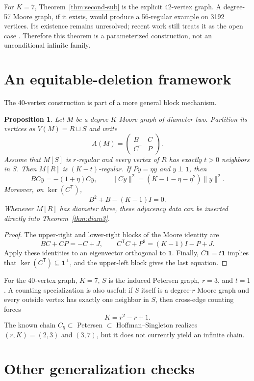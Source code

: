 \documentclass[11pt,reqno]{amsart}
\newcommand{\one}{\mathbf 1}
\theoremstyle{plain}
\newtheorem{proposition}[theorem]{Proposition}
\theoremstyle{definition}
\theoremstyle{remark}
\begin{document}
For $K=7$, Theorem~\ref{thm:second-sub} is the explicit 42-vertex graph.  A
degree-57 Moore graph, if it exists, would produce a 56-regular example on
3192 vertices.  Its existence remains unresolved; recent work still treats
it as the open case \cite{SmithMontemanni2026}.  Therefore this theorem is a
parameterized construction, not an unconditional infinite family.

\section{An equitable-deletion framework}

The 40-vertex construction is part of a more general block mechanism.

\begin{proposition}\label{prop:equitable-delete}
Let $M$ be a degree-$K$ Moore graph of diameter two.  Partition its vertices
as $V(M)=R\sqcup S$ and write
\[
 A(M)=\begin{pmatrix}B&C\\C^{\mathsf T}&P\end{pmatrix}.
\]
Assume that $M[S]$ is $r$-regular and every vertex of $R$ has exactly $t>0$
neighbors in $S$.  Then $M[R]$ is $(K-t)$-regular.  If $Py=\eta y$ and
$y\perp\one$, then
\[
 BCy=-(1+\eta)Cy,
 \qquad
 \|Cy\|^2=(K-1-\eta-\eta^2)\|y\|^2.
\]
Moreover, on $\ker(C^{\mathsf T})$,
\[
 B^2+B-(K-1)I=0.
\]
Whenever $M[R]$ has diameter three, these adjacency data can be inserted
directly into Theorem~\ref{thm:diam3}.
\end{proposition}

\begin{proof}
The upper-right and lower-right blocks of the Moore identity are
\[
 BC+CP=-C+J,
 \qquad
 C^{\mathsf T}C+P^2=(K-1)I-P+J.
\]
Apply these identities to an eigenvector orthogonal to $\one$.  Finally,
$C\one=t\one$ implies that $\ker(C^{\mathsf T})\subseteq\one^\perp$, and
the upper-left block gives the last equation.
\end{proof}

For the 40-vertex graph, $K=7$, $S$ is the induced Petersen graph,
$r=3$, and $t=1$.  A counting specialization is also useful: if $S$ itself
is a degree-$r$ Moore graph and every outside vertex has exactly one neighbor
in $S$, then cross-edge counting forces
\[
 K=r^2-r+1.
\]
The known chain $C_5\subset$ Petersen $\subset$ Hoffman--Singleton realizes
$(r,K)=(2,3)$ and $(3,7)$, but it does not currently yield an infinite chain.

\section{Other generalization checks}
\end{document}
